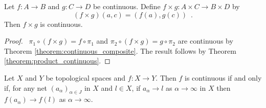 \begin{proposition}
    Let $f : A \rightarrow B$ and $g : C \rightarrow D$ be continuous. Define $f \times g : A \times C \rightarrow B \times D$ by
    \[ (f \times g)(a,c) = (f(a), g(c)) \enspace . \]
    Then $f \times g$ is continuous.
\end{proposition}

\begin{proof}
    \pf\ $\pi_1 \circ (f \times g) = f \circ \pi_1$ and $\pi_2 \circ (f \times g) = g \circ \pi_2$ are continuous
    by Theorem \ref{theorem:continuous_composite}. The result follows by Theorem \ref{theorem:product_continuous}.
\end{proof}

\begin{proposition}
    \label{proposition:converge_continuous}
    Let $X$ and $Y$ be topological spaces and $f : X \rightarrow Y$.
    Then $f$ is continuous if and only if, for any net
    $(a_\alpha)_{\alpha \in J}$ in $X$ and $l \in X$,
    if $a_\alpha \rightarrow l$ as $\alpha \rightarrow \infty$ in $X$ then
    $f(a_\alpha) \rightarrow f(l)$ as $\alpha \rightarrow \infty$.
\end{proposition}

